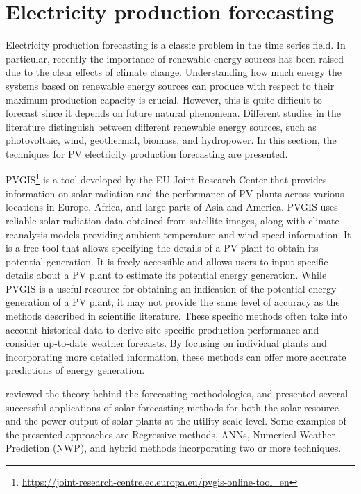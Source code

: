\section{Electricity production forecasting}
\label{sec:productionsoa}
\vspace{0.2 cm}

Electricity production forecasting is a classic problem in the time series field.
In particular, recently the importance of renewable energy sources has been raised due to the clear effects of climate change.
Understanding how much energy the systems based on renewable energy sources can produce with respect to their maximum production capacity is crucial.
However, this is quite difficult to forecast since it depends on future natural phenomena.
Different studies in the literature distinguish between different renewable energy sources, such as photovoltaic, wind, geothermal, biomass, and hydropower.
In this section, the techniques for PV electricity production forecasting are presented.

PVGIS\footnote{ \url{https://joint-research-centre.ec.europa.eu/pvgis-online-tool_en} } is a tool developed by the EU-Joint Research Center that provides information on solar radiation and the performance of PV plants across various locations in Europe, Africa, and large parts of Asia and America.
PVGIS uses reliable solar radiation data obtained from satellite images, along with climate reanalysis models providing ambient temperature and wind speed information.
It is a free tool that allows specifying the details of a PV plant to obtain its potential generation.
It is freely accessible and allows users to input specific details about a PV plant to estimate its potential energy generation.
While PVGIS is a useful resource for obtaining an indication of the potential energy generation of a PV plant, it may not provide the same level of accuracy as the methods described in scientific literature.
These specific methods often take into account historical data to derive site-specific production performance and consider up-to-date weather forecasts.
By focusing on individual plants and incorporating more detailed information, these methods can offer more accurate predictions of energy generation.

\cite{INMAN2013535} reviewed the theory behind the forecasting methodologies, and presented several successful applications of solar forecasting methods for both the solar resource and the power output of solar plants at the utility-scale level.
Some examples of the presented approaches are Regressive methods, ANNs, Numerical Weather Prediction (NWP), and hybrid methods incorporating two or more techniques.

